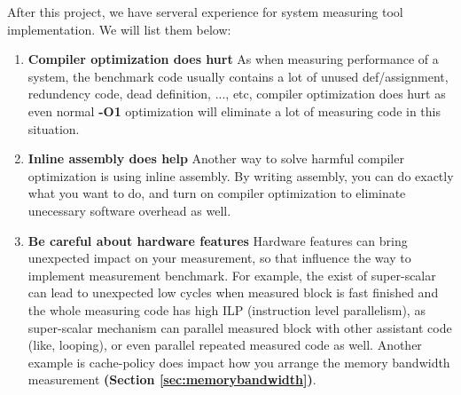 After this project, we have serveral experience for system measuring tool implementation. We will list them below:

\begin{enumerate}
    \item \textbf{Compiler optimization does hurt} As when measuring performance of a system, the benchmark code usually contains a lot of unused def/assignment, redundency code, dead definition, ..., etc, compiler optimization does hurt as even normal \textbf{-O1} optimization will eliminate a lot of measuring code in this situation.
    \item \textbf{Inline assembly does help} Another way to solve harmful compiler optimization is using inline assembly. By writing assembly, you can do exactly what you want to do, and turn on compiler optimization to eliminate unecessary software overhead as well.
    \item \textbf{Be careful about hardware features} Hardware features can bring unexpected impact on your measurement, so that influence the way to implement measurement benchmark. For example, the exist of super-scalar can lead to unexpected low cycles when measured block is fast finished and the whole measuring code has high ILP (instruction level parallelism), as super-scalar mechanism can parallel measured block with other assistant code (like, looping), or even parallel repeated measured code as well. Another example is cache-policy does impact how you arrange the memory bandwidth measurement \textbf{(Section \ref{sec:memorybandwidth})}.
\end{enumerate}
